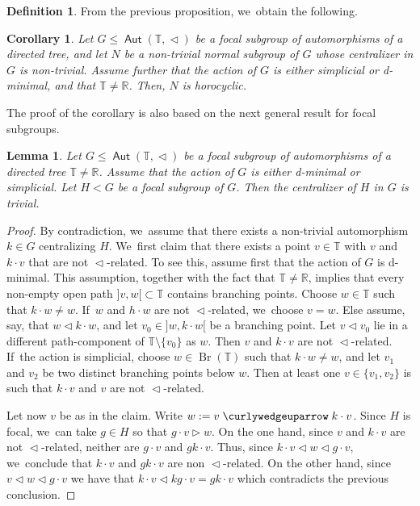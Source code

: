 \documentclass[JEP,XML,SOM,Unicode,NoFloatCountersInSection,published]{cedram}
\newtheorem{lem}[thm]{Lemma}
\newtheorem{cor}[thm]{Corollary}
\theoremstyle{definition}
\newtheorem{dfn}[thm]{Definition}
\DeclareMathOperator{\Aut}{\mathsf{Aut}}
\newcommand{\R}{\mathbb{R}}
\newcommand{\Tbb}{\mathbb T}
\newcommand{\treeorder}{\mathrel{\triangleleft}}
\newcommand{\treeorderop}{\mathrel{\triangleright}}
\newcommand{\treeup}{\mathrel{\curlywedgeuparrow}}
\begin{document}
\begin{dfn}
From the previous proposition, we~obtain the following.

\begin{cor}\label{c-normal-focal-centralizer}
Let $G\leq \Aut(\Tbb,\treeorder)$ be a focal subgroup of automorphisms of a directed tree, and let $N$ be a non-trivial normal subgroup of $G$ whose centralizer in $G$ is non-trivial. Assume further that the action of $G$ is either simplicial or d-minimal, and that $\Tbb\neq\R$. Then, $N$ is horocyclic.
\end{cor}

The proof of the corollary is also based on the next general result for focal subgroups.

\begin{lem}\label{l-centralizer-focal}
Let $G\leq \Aut(\Tbb, \treeorder)$ be a focal subgroup of automorphisms of a directed tree $\Tbb\neq\R$. Assume that the action of $G$ is either d-minimal or simplicial. Let $H<G$ be a focal subgroup of $G$. Then the centralizer of $H$ in $G$ is trivial.
\end{lem}
\begin{proof} By contradiction, we~assume that there exists a non-trivial automorphism $k\in G$ centralizing $H$. We~first claim that there exists a point $v\in\Tbb$ with $v$ and $k\cdot v$ that are not $\treeorder$-related. To see this, assume first that the action of $G$ is d-minimal. This assumption, together with the fact that $\Tbb\neq \R$, implies that every non-empty open path $]v, w[{}\subset \Tbb$ contains branching points. Choose $w\in \Tbb$ such that $k\cdot w\neq w$. If~$w$ and $h\cdot w$ are not $\treeorder$-related, we~choose $v=w$. Else assume, say, that $w\treeorder k\cdot w$, and let $v_0\in ]w, k\cdot w[$ be a branching point. Let $v\treeorder v_0$ lie in a different path-component of $\Tbb \setminus\{v_0\}$ as $w$. Then $v$ and $k\cdot v$ are not $\treeorder$-related. If~the action is simplicial, choose $w\in \operatorname{Br}(\Tbb)$ such that $k\cdot w \neq w$, and let $v_1$ and $v_2$ be two distinct branching points below $w$. Then at least one $v\in \{v_1,v_2\}$ is such that $k\cdot v$ and $v$ are not $\treeorder$-related.

Let now $v$ be as in the claim. Write $w:=v\treeup k\cdot v$. Since $H$ is focal, we~can take $g\in H$ so that $g\cdot v\treeorderop w$. On the one hand, since $v$ and $k\cdot v$ are not $\treeorder$-related, neither are $g\cdot v$ and $gk\cdot v$. Thus, since $k\cdot v\treeorder w\treeorder g\cdot v$, we~conclude that $k\cdot v$ and $gk\cdot v$ are non $\treeorder$-related. On the other hand, since $v\treeorder w\treeorder g\cdot v$ we have that $k\cdot v\treeorder kg\cdot v=gk\cdot v$ which contradicts the previous conclusion. \qedhere
\end{proof}


\end{dfn}
\end{document}
